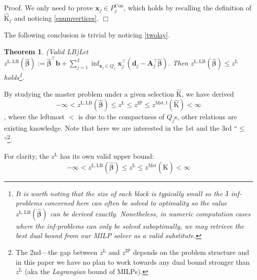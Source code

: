 \documentclass[journal]{IEEEtran}
\newtheorem{theorem}{Theorem}
\newcommand{\boxend}{\hfill $\Box$}
\begin{document}
Proof. We only need to prove $\mathbf{x}_j \in P^\mathrm{Con}_j$,
which holds by recalling the definition of $\hat{\mathrm{K}}_j$
and noticing \eqref{enumvertices}. \boxend
\par
The following conclusion is trivial by noticing \eqref{twolay}.
\begin{theorem}(Valid LB)\label{theorem:lb}
    Let \( z^{\mathrm{L}, \mathrm{LB}}(\hat{\boldsymbol{\beta}}) := \hat{\boldsymbol{\beta}}^\top\mathbf{b} + \sum_{j=1}^\mathrm{J} \inf_{\mathbf{x}_j \in Q_j} \mathbf{x}_j^\top (\mathbf{d}_j - \mathbf{A}_j^\top \hat{\boldsymbol{\beta}}) \).
    Then \( z^{\mathrm{L}, \mathrm{LB}}(\hat{\boldsymbol{\beta}}) \le z^\mathrm{L} \) holds\footnote{It is worth noting that the size of each block is typically small so the $\mathrm{J}$ inf-problems
    concerned here can often be solved to optimality so the value
    $z^{\mathrm{L}, \mathrm{LB}}(\hat{\boldsymbol{\beta}})$ can be derived exactly.
    Nonetheless, in numeric computation cases where the inf-problems can only be solved suboptimally,
    we may retrieve the best dual bound from our MILP solver as a valid substitute.}. 
\end{theorem}
\par
By studying the master problem under a given selection $\hat{\mathrm{K}}$, we have derived
\begin{equation}\label{zipbounds}
    -\infty < z^{\mathrm{L}, \mathrm{LB}}(\hat{\boldsymbol{\beta}}) \le z^\mathrm{L} \le z^\mathrm{IP} \le z^{\mathrm{Mst}, \mathbb{I}}(\hat{\mathrm{K}}) < \infty
\end{equation}
, where the leftmost $<$ is due to the compactness of $Q_j$s, other relations
are existing knowledge.
Note that here we are interested in the 1st and the 3rd ``$\le$''\footnote{The 2nd---the gap between $z^\mathrm{L}$ and $z^\mathrm{IP}$ depends on
the problem structure and in this paper we have no plan to work towards
any dual bound stronger than $z^\mathrm{L}$
(aka the \textit{Lagrangian} bound of MILPs).}.
\par
For clarity, the $z^\mathrm{L}$ has its own valid upper bound:
\begin{equation}\label{zlbounds}
    -\infty < z^{\mathrm{L}, \mathrm{LB}}(\hat{\boldsymbol{\beta}}) \le z^\mathrm{L} \le z^\mathrm{Mst}(\hat{\mathrm{K}}) < \infty
\end{equation}
\end{document}
